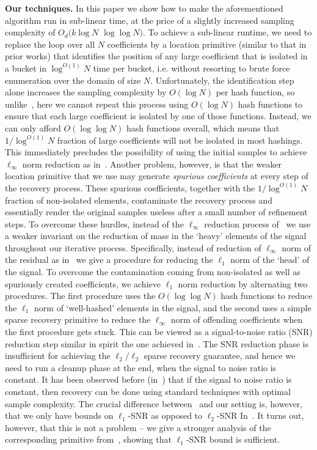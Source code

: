 {\bf Our techniques.} In this paper we show how to make the aforementioned algorithm run in sub-linear time, at the price of a slightly increased sampling complexity of $O_d(k\log N$ $\log\log N)$. To achieve a sub-linear runtime, we need to replace the loop over all $N$ coefficients by a location  primitive (similar to that in prior works) that identifies the position of any large coefficient that is isolated in a bucket in $\log^{O(1)} N$ time per bucket, i.e. without resorting to brute force enumeration over the domain of size $N$. Unfortunately, the identification step alone increases the sampling complexity by $O(\log N)$ per hash function, so unlike~\cite{IK14a}, here we cannot repeat this process using $O(\log N)$ hash functions to ensure that each large coefficient is isolated by one of those functions. Instead, we can only afford $O(\log \log N)$  hash functions overall, which means that $1/\log^{O(1)} N$ fraction of large coefficients will not be isolated in most hashings. This immediately precludes the possibility of using the initial samples to achieve $\ell_\infty$ norm reduction as in~\cite{IK14a}. Another problem, however, is that the weaker location primitive that we use may  generate {\em spurious coefficients} at every step of the recovery process. These spurious coefficients, together with the $1/\log^{O(1)} N$ fraction of non-isolated elements, contaminate the recovery process and essentially render the original samples useless after a small number of refinement steps. To overcome these hurdles, instead of the $\ell_\infty$ reduction process of~\cite{IK14a} we use a weaker invariant on the reduction of mass in the `heavy' elements of the signal throughout our iterative process. Specifically, instead of reduction of $\ell_\infty$ norm of the residual as in~\cite{IK14a} we give a procedure for reducing the $\ell_1$ norm of the `head' of the signal. To overcome the contamination coming from non-isolated as well as spuriously created coefficients, we achieve $\ell_1$ norm reduction by alternating two procedures. The first procedure uses the $O(\log\log N)$ hash functions to reduce the $\ell_1$ norm of `well-hashed' elements in the signal, and the second uses a simple sparse recovery primitive to reduce the $\ell_\infty$ norm of offending coefficients when the first procedure gets stuck.  This can be viewed as a signal-to-noise ratio (SNR) reduction step similar in spirit the one achieved in~\cite{IKP}. The SNR reduction phase is insufficient for achieving the $\ell_2/\ell_2$ sparse recovery guarantee, and hence we need to run a cleanup phase at the end, when the signal to noise ratio is constant. It has been observed before (in~\cite{IKP}) that if the signal to noise ratio is constant, then recovery can be done using standard techniques with optimal sample complexity. The crucial difference between~\cite{IKP} and our setting is, however, that we only have bounds on $\ell_1$-SNR as opposed to $\ell_2$-SNR In~\cite{IKP}. It turns out, however, that this is not a problem -- we give a stronger analysis of the corresponding primitive from~\cite{IKP}, showing that $\ell_1$-SNR bound is sufficient.

